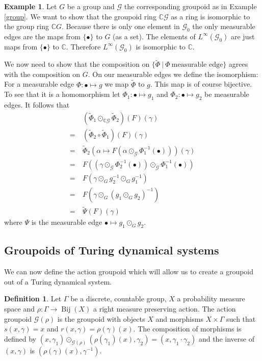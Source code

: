 \documentclass[12pt,a4paper]{scrartcl}
\theoremstyle{plain}
\theoremstyle{definition}
\newtheorem{Definition}[Theorem]{Definition}
\newtheorem{Example}[Theorem]{Example}
\numberwithin{equation}{section}
\newcommand{\C}{\mathbb{C}} %
\newcommand{\2}{\mathbb{Z} / 2 \mathbb{Z}}
\newcommand{\G}{\mathcal{G}}
\newcommand{\1}{\bar{1}}
\newcommand{\0}{\bar{0}}
\newcommand{\Bij}{\operatorname{Bij}}
\begin{document}
\begin{Example} \label{groupoid_ring_of_groups}
	Let $G$ be a group and $\G$ the corresponding groupoid as in Example \ref{group}. We want to show that the groupoid ring $\C \G$ as a ring is isomorphic to the group ring $\C G$. Because there is only one element in $\G_0$ the only measurable edges are the maps from $\{\bullet\}$ to $G$ (as a set). The elements of $L^\infty(\G_0)$ are just maps from $\{\bullet \}$ to $\C$. Therefore  $L^\infty(\G_0)$ is isomorphic to $\C$. 
	
	We now need to show that the composition on $\{\tilde{\Phi}~|~ \Phi~\text{measurable edge}\}$ agrees with the composition on $G$.
	On our measurable edges we define the isomorphism: For a measurable edge $\Phi\colon\bullet \mapsto g$ we map $\tilde{\Phi}$ to $g$. This map is of course bijective. To see that it is a homomorphism let $\Phi_1\colon\bullet \mapsto g_1$ and $\Phi_2\colon\bullet \mapsto g_2$ be measurable edges. It follows that
	\begin{align*}
		  &~ (\tilde{\Phi}_1 \odot_{\C \G} \tilde{\Phi}_2)(F)(\gamma) \\
		= &~ (\tilde{\Phi}_2 \circ \tilde{\Phi}_1)(F)(\gamma) \\
		= &~ \tilde \Phi_2 (\alpha \mapsto F(\alpha \odot_{\G}\Phi_1^{-1}(\bullet)))(\gamma) \\
		= &~ F((\gamma \odot_{\G} \Phi_2^{-1}(\bullet)) \odot_{\G} \Phi_1^{-1}(\bullet)) \\
		= &~ F(\gamma \odot_G g_2^{-1} \odot_G g_1^{-1}) \\
		= &~ F(\gamma \odot_G (g_1 \odot_G g_2)^{-1}) \\
		= &~ \tilde{\Psi} (F)(\gamma)
	\end{align*}
	where $\Psi$ is the measurable edge $\bullet \mapsto g_1 \odot_G g_2$.
\end{Example}


\subsection{Groupoids of Turing dynamical systems}
We can now define the action groupoid which will allow us to create a groupoid out of a Turing dynamical system.
\begin{Definition} \label{action_groupoid}
	Let $\Gamma$ be a discrete, countable group, $X$ a probability measure space and $\rho\colon\Gamma \to \Bij(X)$ a right measure preserving action. The action groupoid $\G(\rho)$ is the groupoid with objects $X$ and morphisms $X \times \Gamma$ such that $s(x,\gamma) = x$ and $r(x, \gamma) = \rho(\gamma) (x)$. The composition of morphisms is defined by $(x, \gamma_1) \odot_{\G(\rho)} (\rho(\gamma_1) (x), \gamma_2) = (x, \gamma_1 \cdot \gamma_2)$ and the inverse of $(x, \gamma)$ is $(\rho(\gamma) (x), \gamma^{-1})$.
\end{Definition}
\end{document}
